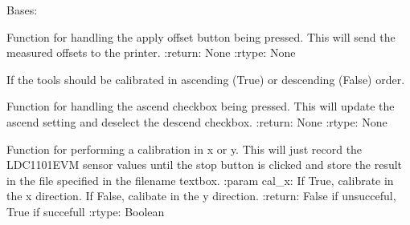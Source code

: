 \documentclass[letterpaper,10pt,english]{sphinxmanual}
\begin{document}
\begin{fulllineitems}
\label{\detokenize{index:app.MainWindow}}
\sphinxAtStartPar
Bases: 

\begin{fulllineitems}
\label{\detokenize{index:app.MainWindow.apply_offsets}}
\sphinxAtStartPar
Function for handling the apply offset button being pressed. This will send the measured offsets to the printer.
:return: None
:rtype: None

\end{fulllineitems}


\begin{fulllineitems}
\label{\detokenize{index:app.MainWindow.ascend}}
\sphinxAtStartPar
If the tools should be calibrated in ascending (True) or descending (False) order.

\end{fulllineitems}


\begin{fulllineitems}
\label{\detokenize{index:app.MainWindow.ascend_changed}}
\sphinxAtStartPar
Function for handling the ascend checkbox being pressed. This will update the ascend setting and deselect the descend checkbox.
:return: None
:rtype: None

\end{fulllineitems}


\begin{fulllineitems}
\label{\detokenize{index:app.MainWindow.calibrate}}
\sphinxAtStartPar
Function for performing a calibration in x or y. This will just record the LDC1101EVM sensor values until the stop button is clicked and store the result in the file specified in the filename textbox.
:param cal\_x: If True, calibrate in the x direction. If False, calibate in the y direction.
:return: False if unsucceful, True if succefull
:rtype: Boolean


\end{fulllineitems}
\end{fulllineitems}
\end{document}
